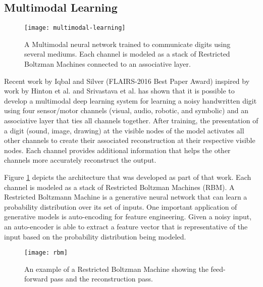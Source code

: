 \subsection{Multimodal Learning} \label{sec:theory-approach-multimodal-learning}

\begin{figure}[t]
	\centering
	\texttt{[image: multimodal-learning]}
	\caption{A Multimodal neural network trained to communicate digits using several mediums. Each channel is modeled as a stack of Restricted Boltzman Machines connected to an associative layer\cite{iqbal2016scalable}.}
	\label{fig:multimodal-learning}
\end{figure}

Recent work by Iqbal and Silver (FLAIRS-2016 Best Paper Award)\cite{iqbal2016scalable} inspired by work by Hinton et al.\cite{Hinton:2006:FLA:1161603.1161605} and Srivastava et al.\cite{JMLR:v15:srivastava14b} has shown that it is possible to develop a multimodal deep learning system for learning a noisy handwritten digit using four sensor/motor channels (visual, audio, robotic, and symbolic) and an associative layer that ties all channels together.  After training, the presentation of a digit (sound, image, drawing) at the visible nodes of the model activates all other channels to create their associated reconstruction at their respective visible nodes. Each channel provides additional information that helps the other channels more accurately reconstruct the output. 

Figure \ref{fig:multimodal-learning} depicts the architecture that was developed as part of that work. Each channel is modeled as a stack of Restricted Boltzman Machines (RBM). A Restricted Boltzmann Machine is a generative neural network that can learn a probability distribution over its set of inputs. One important application of generative models is auto-encoding for feature engineering. Given a noisy input, an auto-encoder is able to extract a feature vector that is representative of the input based on the probability distribution being modeled\cite{pmlr-v5-salakhutdinov09a}.

\begin{figure}[t]
	\centering
	\texttt{[image: rbm]}
	\caption{An example of a Restricted Boltzman Machine showing the feed-forward pass and the reconstruction pass.}
	\label{fig:rbm}
\end{figure}

